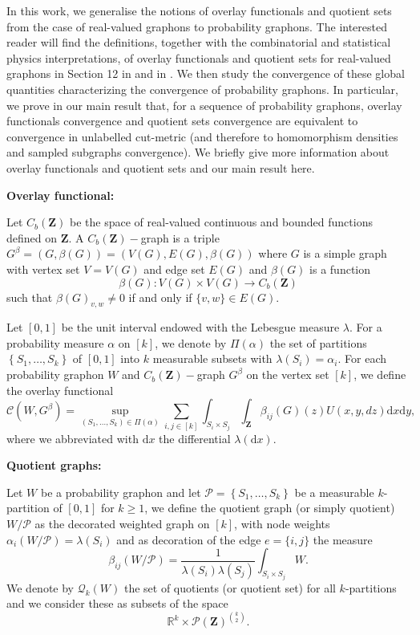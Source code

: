 \documentclass[11pt]{article}
\def\R{\mathbb{R}}
\newcommand{\cP}{{\mathcal P}}  %
\newcommand{\Space}{\mathbf{Z}}
\newcommand{\CbFunct}{C_b(\Space)}
\begin{document}
In this work, we generalise the notions of overlay functionals and quotient sets from the case of real-valued graphons to probability graphons. The interested reader will find the definitions, together with the combinatorial and statistical physics interpretations, of overlay functionals and quotient sets for real-valued graphons in Section 12 in \cite{LovaszGraphLimits} and in \cite{borgs2011convergentAnnals}. 
We then study the convergence of these global quantities characterizing the convergence of probability graphons. In particular, we prove in our main result that, for a sequence of probability graphons, overlay functionals convergence and quotient sets convergence are equivalent to convergence in unlabelled cut-metric (and therefore to homomorphism densities and sampled subgraphs convergence).
We briefly give more information about overlay functionals and quotient sets and our main result here. 

\textbf{Overlay functional:}

Let $\CbFunct$ be the space of real-valued continuous and bounded functions defined on $\Space.$ A $\CbFunct-$graph is a triple $G^{\beta}=(G,\beta(G))=(V(G),E(G),\beta(G))$ where $G$ is a simple graph with vertex set $V=V(G)$ and edge set $E(G)$ and $\beta(G)$ is a function
$$
\beta(G):V(G)\times V(G)\rightarrow \CbFunct $$
such that $\beta(G)_{v,w}\neq 0$ if and only if $\{v,w\}\in E(G).$

Let $[0,1]$ be the unit interval endowed with the Lebesgue measure $\lambda.$ For a probability measure $\alpha$ on $[k]$, we denote by $\Pi(\alpha)$ the set of partitions $\left\{S_1, \ldots, S_k\right\}$ of $[0,1]$ into $k$ measurable subsets with $\lambda\left(S_i\right)=\alpha_i$. For each probability graphon  $W$ and $\CbFunct-$graph $G^{\beta}$ on the vertex set $[k]$, we define the overlay functional
\begin{equation}  
\mathcal{C}(W, G^{\beta})=\sup _{\left(S_{ 1}, \ldots, S_k\right) \in \Pi(\alpha)} \sum_{i, j \in[k]}  \int_{S_i \times S_j}\int_{\Space} \beta_{i j}(G)(z)U(x, y,dz) \mathrm{d} x \mathrm{d} y,
\end{equation}
where we abbreviated with $\mathrm{d} x$ the differential $\lambda(\mathrm{d} x ).$

\textbf{Quotient graphs:}

Let $W$ be a probability graphon and let $\mathcal{P}=\left\{S_1, \ldots, S_k\right\}$ be a measurable $k$-partition of $[0,1]$ for $k\geq 1$, we define the quotient graph (or simply quotient) $W / \mathcal{P}$  as the decorated weighted graph on $[k]$, with node weights $\alpha_i(W / \mathcal{P})=\lambda\left(S_i\right)$ and as decoration of the edge $e=\{i,j\}$ the measure
$$
\beta_{i j}(W / \mathcal{P})=\frac{1}{\lambda\left(S_i\right) \lambda\left(S_j\right)} \int_{S_i \times S_j} W .
$$
We denote by $\mathcal{Q}_k(W)$ the set of quotients (or quotient set) for all $k$-partitions and we consider these as subsets of the space $$\R^k\times\cP(\Space)^{{k} \choose {2}}.$$
\end{document}
